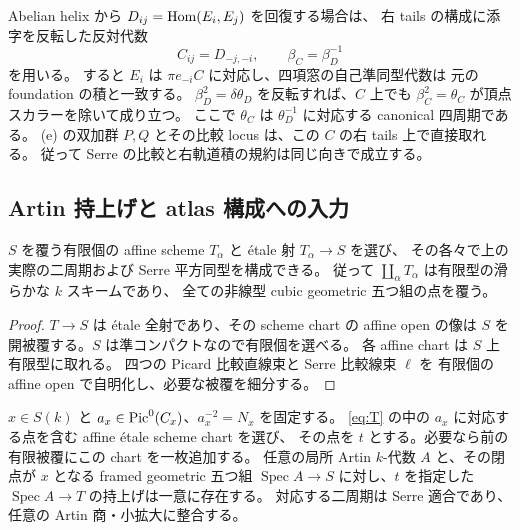 \begin{remark}
Abelian helix から $D_{ij}=\operatorname{Hom}(E_i,E_j)$ を回復する場合は、
右 tails の構成に添字を反転した反対代数
\[
 C_{ij}=D_{-j,-i},\qquad \beta_C=\beta_D^{-1}
\]
を用いる。
すると $E_i$ は $\pi e_{-i}C$ に対応し、四項窓の自己準同型代数は
元の foundation の積と一致する。
$\beta_D^2=\delta\theta_D$ を反転すれば、$C$ 上でも
$\beta_C^2=\theta_C$ が頂点スカラーを除いて成り立つ。
ここで $\theta_C$ は $\theta_D^{-1}$ に対応する canonical 四周期である。
(e) の双加群 $P,Q$ とその比較 locus は、この $C$ の右 tails 上で直接取れる。
従って Serre の比較と右軌道積の規約は同じ向きで成立する。
\end{remark}

\subsection{Artin 持上げと atlas 構成への入力}

\begin{corollary}\label{cor:finite-type-root-chart}
$S$ を覆う有限個の affine scheme $T_\alpha$ と étale 射 $T_\alpha\to S$ を選び、
その各々で上の実際の二周期および Serre 平方同型を構成できる。
従って $\coprod_\alpha T_\alpha$ は有限型の滑らかな $k$ スキームであり、
全ての非線型 cubic geometric 五つ組の点を覆う。
\end{corollary}

\begin{proof}
$T\to S$ は étale 全射であり、その scheme chart の affine open の像は
$S$ を開被覆する。$S$ は準コンパクトなので有限個を選べる。
各 affine chart は $S$ 上有限型に取れる。
四つの Picard 比較直線束と Serre 比較線束 $\ell$ を
有限個の affine open で自明化し、必要な被覆を細分する。
\end{proof}

\begin{corollary}\label{cor:all-artin-root}
$x\in S(k)$ と $a_x\in\operatorname{Pic}^0(C_x)$、$a_x^{-2}=N_x$ を固定する。
\eqref{eq:T} の中の $a_x$ に対応する点を含む affine étale scheme chart を選び、
その点を $t$ とする。必要なら前の有限被覆にこの chart を一枚追加する。
任意の局所 Artin $k$-代数 $A$ と、その閉点が $x$ となる framed geometric
五つ組 $\operatorname{Spec} A\to S$ に対し、$t$ を指定した $\operatorname{Spec} A\to T$ の持上げは一意に存在する。
対応する二周期は Serre 適合であり、任意の Artin 商・小拡大に整合する。
\end{corollary}

